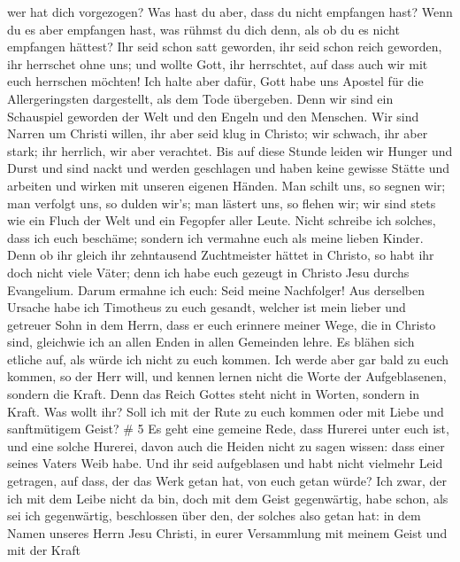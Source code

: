 wer hat dich vorgezogen? Was hast du aber, dass du nicht empfangen hast?
Wenn du es aber empfangen hast, was rühmst du dich denn, als ob du es
nicht empfangen hättest?  Ihr seid schon satt geworden, ihr
seid schon reich geworden, ihr herrschet ohne uns; und wollte Gott, ihr
herrschtet, auf dass auch wir mit euch herrschen möchten! 
Ich halte aber dafür, Gott habe uns Apostel für die Allergeringsten
dargestellt, als dem Tode übergeben. Denn wir sind ein Schauspiel
geworden der Welt und den Engeln und den Menschen.  Wir
sind Narren um Christi willen, ihr aber seid klug in Christo; wir
schwach, ihr aber stark; ihr herrlich, wir aber verachtet. 
Bis auf diese Stunde leiden wir Hunger und Durst und sind nackt und
werden geschlagen und haben keine gewisse Stätte  und
arbeiten und wirken mit unseren eigenen Händen. Man schilt uns, so
segnen wir; man verfolgt uns, so dulden wir's; man lästert uns, so
flehen wir;  wir sind stets wie ein Fluch der Welt und ein
Fegopfer aller Leute.  Nicht schreibe ich solches, dass ich
euch beschäme; sondern ich vermahne euch als meine lieben Kinder.
 Denn ob ihr gleich ihr zehntausend Zuchtmeister hättet in
Christo, so habt ihr doch nicht viele Väter; denn ich habe euch gezeugt
in Christo Jesu durchs Evangelium.  Darum ermahne ich euch:
Seid meine Nachfolger!  Aus derselben Ursache habe ich
Timotheus zu euch gesandt, welcher ist mein lieber und getreuer Sohn in
dem Herrn, dass er euch erinnere meiner Wege, die in Christo sind,
gleichwie ich an allen Enden in allen Gemeinden lehre.  Es
blähen sich etliche auf, als würde ich nicht zu euch kommen.
 Ich werde aber gar bald zu euch kommen, so der Herr will,
und kennen lernen nicht die Worte der Aufgeblasenen, sondern die Kraft.
 Denn das Reich Gottes steht nicht in Worten, sondern in
Kraft.  Was wollt ihr? Soll ich mit der Rute zu euch kommen
oder mit Liebe und sanftmütigem Geist? \# 5  Es geht eine
gemeine Rede, dass Hurerei unter euch ist, und eine solche Hurerei,
davon auch die Heiden nicht zu sagen wissen: dass einer seines Vaters
Weib habe.  Und ihr seid aufgeblasen und habt nicht vielmehr
Leid getragen, auf dass, der das Werk getan hat, von euch getan würde?
 Ich zwar, der ich mit dem Leibe nicht da bin, doch mit dem
Geist gegenwärtig, habe schon, als sei ich gegenwärtig, beschlossen über
den, der solches also getan hat:  in dem Namen unseres Herrn
Jesu Christi, in eurer Versammlung mit meinem Geist und mit der Kraft

